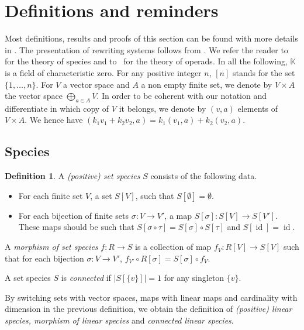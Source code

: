 \documentclass[a4paper]{article}
\DeclareMathOperator{\id}{id}
\theoremstyle{definition}
\newtheorem{definition}{Definition}
\newcommand{\K}{\mathbb{K}}
\begin{document}
\section{Definitions and reminders} \label{sec:preliminaries}

Most definitions, results and proofs of this section can be found with more details in \cite{Men15}.
The presentation of rewriting systems follows from \cite{VP}. We refer the reader to~\cite{BLL98}
for the theory of species and to~\cite{LV12} for the theory of operads. In all the following,
$\K$ is a field of characteristic zero. For any positive integer $n$, $[n]$ stands for the set $\{1,\dots,n\}$.
For $V$ a vector space and $A$ a non empty finite set, we denote by $V\times A$ the vector space
$\bigoplus_{a\in A}V$. In order to be coherent with our notation and differentiate in which copy of
$V$ it belongs, we denote by $(v,a)$ elements of $V\times A$. We hence have $(k_1 v_1+k_2v_2,a) =
k_1(v_1,a) + k_2(v_2,a)$.


\subsection{Species}

\begin{definition}
A \textit{(positive) set species} $S$ consists of the following data.
\begin{itemize}
	\item For each finite set $V$, a set $S[V]$, such that $S[\emptyset] =\emptyset$.
	\item For each bijection of finite sets $\sigma: V\rightarrow V'$, a map $S[\sigma]:S[V]\rightarrow S[V']$.
	These maps should be such that $S[\sigma\circ\tau] = S[\sigma]\circ S[\tau]$ and $S[\id] = \id$.
\end{itemize}

A \textit{morphism of set species} $f: R\rightarrow S$ is a collection of map
$f_V : R[V] \rightarrow S[V]$ such that for each bijection $\sigma: V\rightarrow V'$,
$f_{V'}\circ R[\sigma] = S[\sigma]\circ f_V$.

A set species $S$ is \textit{connected} if $|S[\{v\}]| = 1$ for any singleton $\{v\}$.
\end{definition}

By switching sets with vector spaces, maps with linear maps and cardinality with dimension
in the previous definition, we obtain the definition of \textit{(positive) linear species, 
morphism of linear species} and \textit{connected linear species}.
\end{document}
